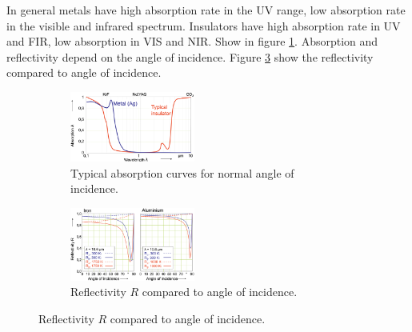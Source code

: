 In general metals have high absorption rate in the UV range, low absorption rate in the visible and infrared spectrum.
Insulators have high absorption rate in UV and FIR, low absorption in VIS and NIR. Show in figure \ref{fig:tanai}.
Absorption and reflectivity depend on the angle of incidence. Figure \ref{fig:ma} show the reflectivity compared to angle of incidence.

\begin{figure}
    \centering
    \begin{subfigure}{0.45\textwidth}
        \includegraphics[width=0.45\textwidth]{slike/armi.png}
        \caption{Typical absorption curves for normal angle of incidence.}
        \label{fig:tanai}
    \end{subfigure}

    \begin{subfigure}{0.45\textwidth}
        \includegraphics[width=0.45\textwidth]{slike/Rangle.png}
        \caption{Reflectivity $R$ compared to angle of incidence.}
        \label{fig:ma}    
    \end{subfigure}
\end{figure}





